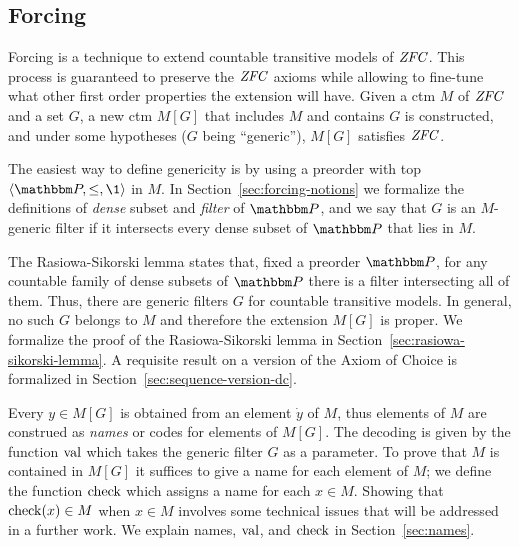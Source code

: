 \subsection{Forcing}
Forcing is a technique to extend countable transitive models of
$\mathit{ZFC}$. This process is guaranteed to preserve the $\mathit{ZFC}$
axioms while allowing to fine-tune what other first order properties the
extension will have. Given a ctm $M$  of $\mathit{ZFC}$ and a set $G$, a new
ctm  $M[G]$  that includes $M$ and
contains $G$ is constructed, and under some hypotheses ($G$ being ``generic''),
$M[G]$ satisfies $\mathit{ZFC}$.

The easiest way to define genericity is by using a preorder with top
$\lb\PP,\leq,\1\rb$ in $M$.   
In Section~\ref{sec:forcing-notions} we formalize the definitions of
\emph{dense} subset and  \emph{filter} of  $\PP$, and we say that  $G$
is an $M$-generic filter
if it intersects every dense subset of $\PP$ that lies in $M$.

The Rasiowa-Sikorski lemma states that, fixed a preorder $\PP$, for
any countable family of dense subsets of $\PP$ there is a filter
intersecting all of them. Thus, there are generic filters $G$ for
countable transitive models. In general, no such $G$ belongs to $M$ and
therefore the extension $M[G]$ is proper. We formalize the proof of
the Rasiowa-Sikorski lemma in
Section~\ref{sec:rasiowa-sikorski-lemma}. A requisite result on a
version of the Axiom of Choice is formalized in
Section~\ref{sec:sequence-version-dc}.

Every  $y \in M[G]$ is obtained from an element $\dot y$ of $M$, thus
elements of $M$ are construed as \emph{names} or codes for elements of
$M[G]$.
The decoding is given by the function
$\operatorname{val}$ which takes the generic filter $G$ as a parameter. To
prove that $M$ is contained in $M[G]$ it suffices to give a name for
each element of $M$; we define the function $\operatorname{check}$ which assigns
a name for each $x\in M$. Showing that $\operatorname{check}(x)\in M$
when $x\in M$ involves some technical issues that will
be addressed in a further work. We explain names, $\operatorname{val}$, and
$\operatorname{check}$ in Section~\ref{sec:names}.

